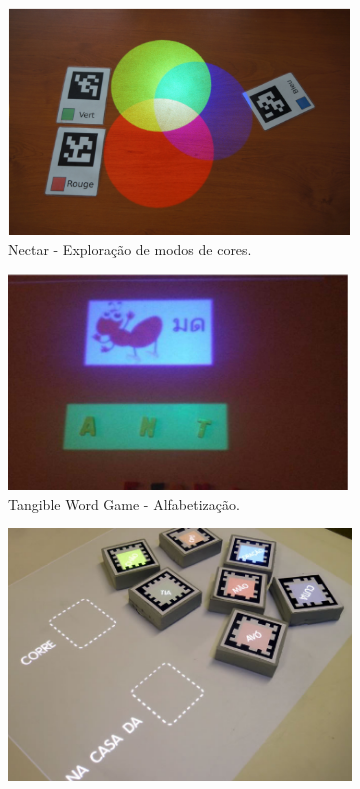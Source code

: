\begin{figure}[h]
    \centering
    \begin{subfigure}{.49\textwidth}
        \includegraphics[width=.9\linewidth,fbox]{figs/nectar.png}
        \caption{Nectar - Exploração de modos de cores.}
        \label{fig_nectar}
    \end{subfigure}
    \begin{subfigure}{.49\textwidth}
        \includegraphics[width=.9\linewidth,fbox]{figs/pinkaew.png}
        \caption{Tangible Word Game - Alfabetização.}
        \label{fig_pinkaew}
    \end{subfigure}
    \begin{subfigure}{.49\textwidth}
        \includegraphics[width=.9\linewidth,fbox]{figs/roberto.png}

\end{subfigure}
\end{figure}
